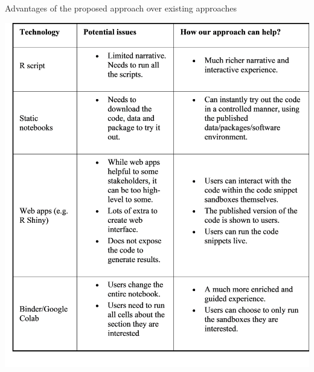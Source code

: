 \newpage

\begin{table}
  \caption{Advantages of the proposed approach over existing approaches}
  \label{tbl:table1}
  \includegraphics[width=\linewidth]{GB_notebook_table2}
\end{table}

